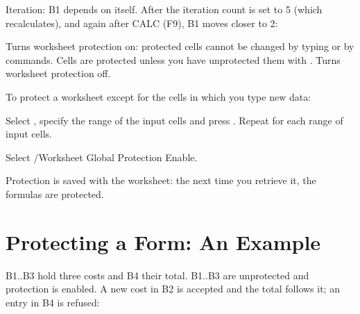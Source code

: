Iteration: B1 depends on itself.  After the iteration count is set to 5
(which recalculates), and again after CALC (F9), B1 moves closer to 2:

\begin{Options}
 Turns worksheet protection on: protected cells cannot be
  changed by typing or by commands.  Cells are protected unless you have
  unprotected them with .
 Turns worksheet protection off.
\end{Options}

To protect a worksheet except for the cells in which you type new data:
\begin{Steps123}
\item Select , specify the range of the input cells
  and press .  Repeat for each range of input cells.
\item Select /Worksheet Global Protection Enable.
\end{Steps123}
Protection is saved with the worksheet: the next time you retrieve it, the
formulas are protected.

\section{Protecting a Form: An Example}
B1..B3 hold three costs and B4 their total.  B1..B3 are unprotected and
protection is enabled.  A new cost in B2 is accepted and the total follows
it; an entry in B4 is refused:


